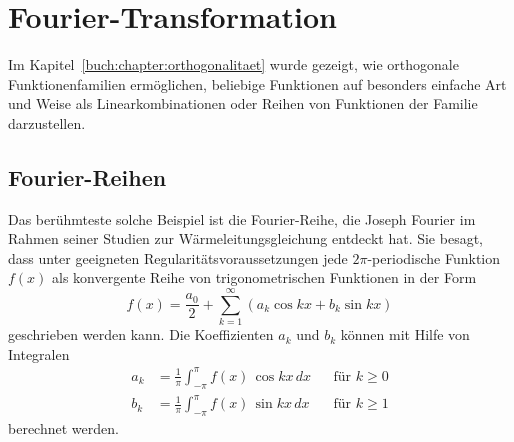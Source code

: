 %
%
%
\section{Fourier-Transformation
\label{buch:fourier:section:fourier}}
Im Kapitel~\ref{buch:chapter:orthogonalitaet}
wurde gezeigt, wie orthogonale Funktionenfamilien ermöglichen,
beliebige Funktionen auf besonders einfache Art und Weise
als Linearkombinationen oder Reihen von Funktionen der Familie
darzustellen.

%
%
\subsection{Fourier-Reihen}
Das berühmteste solche Beispiel ist die Fourier-Reihe, die
Joseph Fourier im Rahmen seiner Studien zur Wärmeleitungsgleichung
entdeckt hat.
Sie besagt, dass unter geeigneten Regularitätsvoraussetzungen
jede $2\pi$-periodische Funktion $f(x)$ als konvergente Reihe von
trigonometrischen Funktionen in der Form
\begin{equation}
f(x)
=
\frac{a_0}2
+
\sum_{k=1}^\infty (a_k \cos kx + b_k \sin kx)
\label{buch:fourier:eqn:fourierreihe}
\end{equation}
geschrieben werden kann.
Die Koeffizienten $a_k$ und $b_k$ können mit Hilfe von Integralen
\[
\begin{aligned}
a_k
&=
\frac{1}{\pi}
\int_{-\pi}^\pi f(x)\, \cos kx\,dx
&&\text{für $k\ge 0$}
\\
b_k
&=
\frac{1}{\pi}
\int_{-\pi}^\pi f(x)\, \sin kx\,dx
&&\text{für $k\ge 1$}
\end{aligned}
\]
berechnet werden.

%
%
